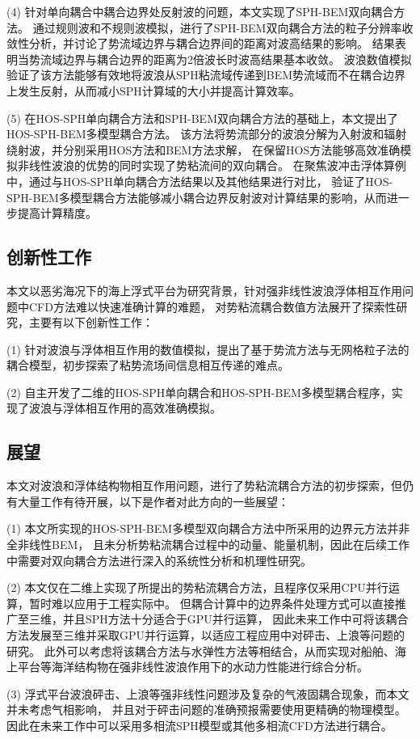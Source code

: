 (4)	针对单向耦合中耦合边界处反射波的问题，本文实现了SPH-BEM双向耦合方法。%
通过规则波和不规则波模拟，进行了SPH-BEM双向耦合方法的粒子分辨率收敛性分析，并讨论了势流域边界与耦合边界间的距离对波高结果的影响。%
结果表明当势流域边界与耦合边界的距离为2倍波长时波高结果基本收敛。%
波浪数值模拟验证了该方法能够有效地将波浪从SPH粘流域传递到BEM势流域而不在耦合边界上发生反射，从而减小SPH计算域的大小并提高计算效率。%

(5)	在HOS-SPH单向耦合方法和SPH-BEM双向耦合方法的基础上，本文提出了HOS-SPH-BEM多模型耦合方法。%
该方法将势流部分的波浪分解为入射波和辐射绕射波，并分别采用HOS方法和BEM方法求解，%
在保留HOS方法能够高效准确模拟非线性波浪的优势的同时实现了势粘流间的双向耦合。%
在聚焦波冲击浮体算例中，通过与HOS-SPH单向耦合方法结果以及其他结果进行对比，%
验证了HOS-SPH-BEM多模型耦合方法能够减小耦合边界反射波对计算结果的影响，从而进一步提高计算精度。

\subsection{
  \texorpdfstring{创新性工作} %
  {\thesubsection 创新性工作} %
}
\label{ssec:创新性工作}

本文以恶劣海况下的海上浮式平台为研究背景，针对强非线性波浪浮体相互作用问题中CFD方法难以快速准确计算的难题，%
对势粘流耦合数值方法展开了探索性研究，主要有以下创新性工作：%

(1)	针对波浪与浮体相互作用的数值模拟，提出了基于势流方法与无网格粒子法的耦合模型，初步探索了粘势流场间信息相互传递的难点。%

(2)	自主开发了二维的HOS-SPH单向耦合和HOS-SPH-BEM多模型耦合程序，实现了波浪与浮体相互作用的高效准确模拟。

\subsection{
  \texorpdfstring{展望} %
  {\thesubsection 展望} %
}
\label{ssec:展望}

本文对波浪和浮体结构物相互作用问题，进行了势粘流耦合方法的初步探索，但仍有大量工作有待开展，以下是作者对此方向的一些展望：%

(1)	本文所实现的HOS-SPH-BEM多模型双向耦合方法中所采用的边界元方法并非全非线性BEM，%
且未分析势粘流耦合过程中的动量、能量机制，因此在后续工作中需要对双向耦合方法进行深入的系统性分析和机理性研究。%

(2)	本文仅在二维上实现了所提出的势粘流耦合方法，且程序仅采用CPU并行运算，暂时难以应用于工程实际中。%
但耦合计算中的边界条件处理方式可以直接推广至三维，并且SPH方法十分适合于GPU并行运算，%
因此未来工作中可将该耦合方法发展至三维并采取GPU并行运算，以适应工程应用中对砰击、上浪等问题的研究。%
此外可以考虑将该耦合方法与水弹性方法等相结合，从而实现对船舶、海上平台等海洋结构物在强非线性波浪作用下的水动力性能进行综合分析。%

(3)	浮式平台波浪砰击、上浪等强非线性问题涉及复杂的气液固耦合现象，而本文并未考虑气相影响，%
并且对于砰击问题的准确预报需要使用更精确的物理模型。%
因此在未来工作中可以采用多相流SPH模型或其他多相流CFD方法进行耦合。
